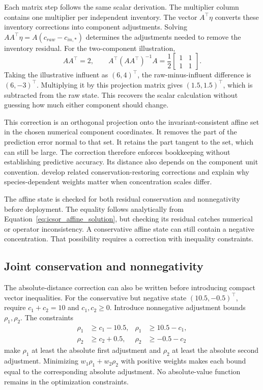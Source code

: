 Each matrix step follows the same scalar derivation. The multiplier column contains one multiplier per independent inventory. The vector \(A^\top\eta\) converts these inventory corrections into component adjustments. Solving \(AA^\top\eta=A(c_{raw}-c_{in,*})\) determines the adjustments needed to remove the inventory residual. For the two-component illustration,
\begin{equation}
\label{eq:icsor_small_affine_matrix}
AA^\top=2,
\qquad
A^\top(AA^\top)^{-1}A
=\frac{1}{2}\begin{bmatrix}1&1\\1&1\end{bmatrix}.
\end{equation}
Taking the illustrative influent as \((6,4)^\top\), the raw-minus-influent difference is \((6,-3)^\top\). Multiplying it by this projection matrix gives \((1.5,1.5)^\top\), which is subtracted from the raw state. This recovers the scalar calculation without guessing how much either component should change.

This correction is an orthogonal projection onto the invariant-consistent affine set in the chosen numerical component coordinates. It removes the part of the prediction error normal to that set. It retains the part tangent to the set, which can still be large. The correction therefore enforces bookkeeping without establishing predictive accuracy. Its distance also depends on the component unit convention. \citet{SturmSilva2024} develop related conservation-restoring corrections and explain why species-dependent weights matter when concentration scales differ.

The affine state is checked for both residual conservation and nonnegativity before deployment. The equality follows analytically from Equation~\eqref{eq:icsor_affine_solution}, but checking its residual catches numerical or operator inconsistency. A conservative affine state can still contain a negative concentration. That possibility requires a correction with inequality constraints.

\subsection{Joint conservation and nonnegativity}

The absolute-distance correction can also be written before introducing compact vector inequalities. For the conservative but negative state \((10.5,-0.5)^\top\), require \(c_1+c_2=10\) and \(c_1,c_2\geq0\). Introduce nonnegative adjustment bounds \(\rho_1,\rho_2\). The constraints
\begin{equation}
\label{eq:icsor_scalar_absolute_constraints}
\begin{aligned}
\rho_1&\geq c_1-10.5,&\rho_1&\geq10.5-c_1,\\
\rho_2&\geq c_2+0.5,&\rho_2&\geq-0.5-c_2
\end{aligned}
\end{equation}
make \(\rho_1\) at least the absolute first adjustment and \(\rho_2\) at least the absolute second adjustment. Minimizing \(w_1\rho_1+w_2\rho_2\) with positive weights makes each bound equal to the corresponding absolute adjustment. No absolute-value function remains in the optimization constraints.

